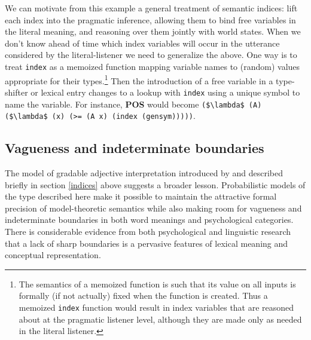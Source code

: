 \documentclass[pdfextras]{handbook}
\begin{document}
We can motivate from this example a general treatment of semantic indices: lift each index into the pragmatic inference, allowing them to bind free variables in the literal meaning, and reasoning over them jointly with world states. 
When we don't know ahead of time which index variables will occur in the utterance considered by the literal-listener we need to generalize the above. 
One way is to treat \lstinline{index} as a memoized function mapping variable names to (random) values appropriate for their types.\footnote{The semantics of a memoized function is such that its value on all inputs is formally (if not actually) fixed when the function is created. Thus a memoized \lstinline{index} function would result in index variables that are reasoned about at the pragmatic listener level, although they are made only as needed in the literal listener.} 
Then the introduction of a free variable in a type-shifter or lexical entry changes to a lookup with \lstinline{index} using a unique symbol to name the variable. For instance, \textbf{POS} would become \lstinline[mathescape]{($\lambda$ (A) ($\lambda$ (x) (>= (A x) (index (gensym)))))}.

\subsection{\label{vagueness}Vagueness and indeterminate boundaries}
The model of gradable adjective interpretation introduced by \citet{lassitergoodman13} and described briefly in section \ref{indices} above suggests a broader lesson. 
Probabilistic models of the type described here make it possible to maintain the attractive formal precision of model-theoretic semantics while also making room for vagueness and indeterminate boundaries in both word meanings and psychological categories. 
There is considerable evidence from both psychological \citep[e.g.][]{rosch78,murphy02,hampton07} and linguistic \citep{taylor2003linguistic} research that a lack of sharp boundaries is a pervasive features of lexical meaning and conceptual representation. 
\end{document}
